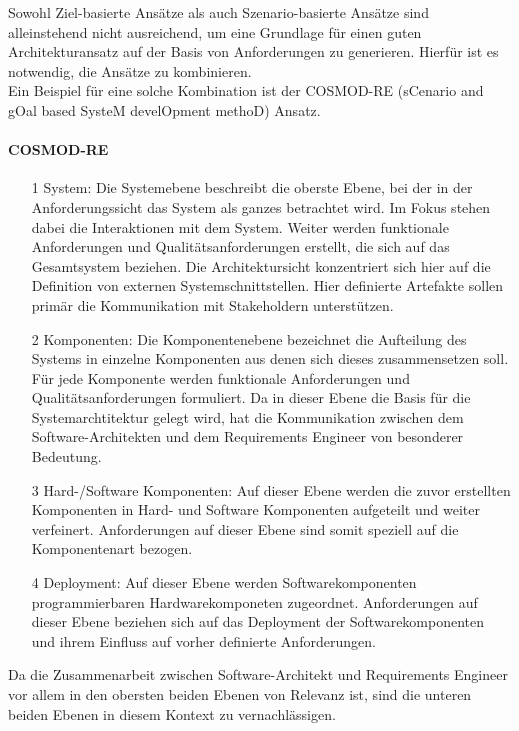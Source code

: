 Sowohl Ziel-basierte Ansätze als auch Szenario-basierte Ansätze sind alleinstehend nicht ausreichend, um eine Grundlage für einen guten Architekturansatz auf der Basis von Anforderungen zu generieren. Hierfür ist es notwendig, die Ansätze zu kombinieren. \\

Ein Beispiel für eine solche Kombination ist der COSMOD-RE (sCenario and gOal based SysteM develOpment methoD) Ansatz. \\

\paragraph{COSMOD-RE}

\begin{itemize}
\item[1] System: Die Systemebene beschreibt die oberste Ebene, bei der in der Anforderungssicht das System als ganzes betrachtet wird. Im Fokus stehen dabei die Interaktionen mit dem System. Weiter werden funktionale Anforderungen und Qualitätsanforderungen erstellt, die sich auf das Gesamtsystem beziehen. Die Architektursicht konzentriert sich hier auf die Definition von externen Systemschnittstellen. Hier definierte Artefakte sollen primär die Kommunikation mit Stakeholdern unterstützen.
\item[2] Komponenten: Die Komponentenebene bezeichnet die Aufteilung des Systems in einzelne Komponenten aus denen sich dieses zusammensetzen soll. Für jede Komponente werden funktionale Anforderungen und Qualitätsanforderungen formuliert. Da in dieser Ebene die Basis für die Systemarchtitektur gelegt wird, hat die Kommunikation zwischen dem Software-Architekten und dem Requirements Engineer von besonderer Bedeutung. 
\item[3] Hard-/Software Komponenten: Auf dieser Ebene werden die zuvor erstellten Komponenten in Hard- und Software Komponenten aufgeteilt und weiter verfeinert. Anforderungen auf dieser Ebene sind somit speziell auf die Komponentenart bezogen. 
\item[4] Deployment: Auf dieser Ebene werden Softwarekomponenten programmierbaren Hardwarekomponeten zugeordnet. Anforderungen auf dieser Ebene beziehen sich auf das Deployment der Softwarekomponenten und ihrem Einfluss auf vorher definierte Anforderungen. 
\end{itemize}
Da die Zusammenarbeit zwischen Software-Architekt und Requirements Engineer vor allem in den obersten beiden Ebenen von Relevanz ist, sind die unteren beiden Ebenen in diesem Kontext zu vernachlässigen.\\

